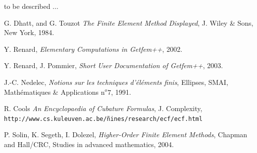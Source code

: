\documentclass[11pt,a4paper]{article}
\begin{document}
to be described ...

\begin{thebibliography}{99}
% 
% 
% 
  G. {\sc Dhatt, and  G. Touzot}
  {\it The Finite Element Method Displayed}, 
 J. Wiley \& Sons,  New York, 1984.

  Y. {\sc Renard},
  {\it Elementary Computations in {\sc Getfem++}}, 2002.

  Y. {\sc Renard}, J. {\sc Pommier},
  {\it Short User Documentation of {\sc Getfem++}}, 2003.

  J.-C. {\sc Nedelec},
  {\it Notions sur les techniques d'{\'e}l{\'e}ments finis}, Ellipses, SMAI, Math{\'e}matiques \& Applications n$^o7$, 1991.

  R. {\sc Cools}
  {\it An Encyclopaedia of Cubature Formulas}, J. Complexity, {\tt http://www.cs.kuleuven.ac.be/{\~n}ines/research/ecf/ecf.html}

  P. {\sc Solin, K. Segeth, I. Dolezel},
  {\it Higher-Order Finite Element Methods}, Chapman and Hall/CRC, Studies in advanced mathematics, 2004.


\end{thebibliography}
\end{document}
